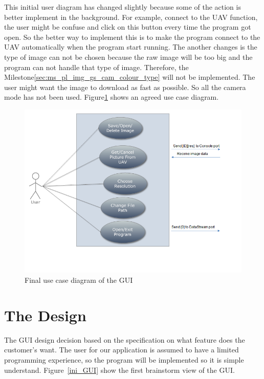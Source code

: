 This initial user diagram has changed slightly because some of the action is better implement in the background. For example, connect to the UAV function, the user might be confuse and click on this button every time the program got open. So the better way to implement this is to make the program connect to the UAV automatically when the program start running. 
The another changes is the type of image can not be chosen because the raw image will be too big and the program can not handle that type of image.
Therefore, the Milestone\ref{sec:ms_pl_img_gs_cam_colour_type} will not be implemented.
The user might want the image to download as fast as possible. So all the camera mode has not been used.
Figure\ref{GUI_finalUseCase} shows an agreed use case diagram. 

\begin{figure}[!hbtp]
\begin{center}
\includegraphics[scale=0.7]{figures/FinaluserCase.png} 
\end{center}
\caption{Final use case diagram of the GUI\label{GUI_finalUseCase}}
\end{figure}



\section{The Design}

The GUI design decision based on the specification on what feature does the customer’s want. 
The user for our application is assumed to have a limited programming experience, so the program will be implemented so it is simple understand. Figure~\ref{ini_GUI} show the first brainstorm view of the GUI. 

